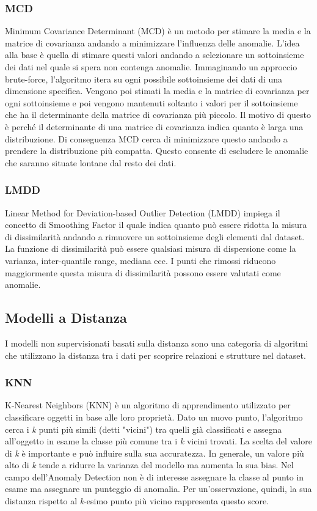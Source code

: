 \subsubsection{MCD}
Minimum Covariance Determinant (MCD) \cite{rousseeuw1999fast, hardin2004outlier} è un metodo per stimare la media e la matrice di covarianza andando a minimizzare l'influenza delle anomalie. L'idea alla base è quella di stimare questi valori andando a selezionare un sottoinsieme dei dati nel quale si spera non contenga anomalie.
Immaginando un approccio brute-force, l'algoritmo itera su ogni possibile sottoinsieme dei dati di una dimensione specifica. Vengono poi stimati la media e la matrice di covarianza per ogni sottoinsieme e poi vengono mantenuti soltanto i valori per il sottoinsieme che ha il determinante della matrice di covarianza più piccolo. Il motivo di questo è perché il determinante di una matrice di covarianza indica quanto è larga una distribuzione. Di conseguenza MCD cerca di minimizzare questo andando a prendere la distribuzione più compatta. Questo consente di escludere le anomalie che saranno situate lontane dal resto dei dati.

\subsubsection{LMDD}
Linear Method for Deviation-based Outlier Detection (LMDD) \cite{arning1996linear} impiega il concetto di Smoothing Factor il quale indica quanto può essere ridotta la misura di dissimilarità andando a rimuovere un sottoinsieme degli elementi dal dataset. La funzione di dissimilarità può essere qualsiasi misura di dispersione come la varianza, inter-quantile range, mediana ecc.
I punti che rimossi riducono maggiormente questa misura di dissimilarità possono essere valutati come anomalie.

\subsection{Modelli a Distanza}
I modelli non supervisionati basati sulla distanza sono una categoria di algoritmi che utilizzano la distanza tra i dati per scoprire relazioni e strutture nel dataset.

\subsubsection{KNN}
K-Nearest Neighbors (KNN) \cite{ramaswamy2000efficient,angiulli2002fast} è un algoritmo di apprendimento utilizzato per classificare oggetti in base alle loro proprietà. Dato un nuovo punto, l'algoritmo cerca i \textit{k} punti più simili (detti "vicini") tra quelli già classificati e assegna all'oggetto in esame la classe più comune tra i \textit{k} vicini trovati. La scelta del valore di \textit{k} è importante e può influire sulla sua accuratezza. In generale, un valore più alto di \textit{k} tende a ridurre la varianza del modello ma aumenta la sua bias.
Nel campo dell'Anomaly Detection non è di interesse assegnare la classe al punto in esame ma assegnare un punteggio di anomalia. Per un'osservazione, quindi, la sua distanza rispetto al \textit{k}-esimo punto più vicino rappresenta questo score.

